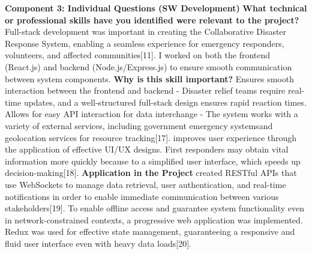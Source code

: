 \documentclass[../main.tex]{subfiles}
\begin{document}
\textbf{Component 3: Individual Questions (SW Development)}
\newline
\newline
\textbf{What technical or professional skills have you identified were relevant to the project?}
\newline
\newline
Full-stack development was important in creating the Collaborative Disaster Response System, enabling a seamless experience for emergency responders, volunteers, and affected communities[11]. I worked on both the frontend (React.js) and backend (Node.js/Express.js) to ensure smooth communication between system components.
\newline
\newline
\textbf{Why is this skill important?}
\newline
\newline
Ensures smooth interaction between the frontend and backend - Disaster relief teams require real-time updates, and a well-structured full-stack design ensures rapid reaction times.
Allows for easy API interaction for data interchange - The system works with a variety of external services, including government emergency systemsand geolocation services for resource tracking[17].
improves user experience through the application of effective UI/UX designs. First responders may obtain vital information more quickly because to a simplified user interface, which speeds up decision-making[18].
\newline
\newline
\textbf{Application in the Project}
\newline
\newline
created RESTful APIs that use WebSockets to manage data retrieval, user authentication, and real-time notifications in order to enable immediate communication between various stakeholders[19].
To enable offline access and guarantee system functionality even in network-constrained contexts, a progressive web application was implemented.
Redux was used for effective state management, guaranteeing a responsive and fluid user interface even with heavy data loads[20].
\newline
\newline
    
\end{document}
